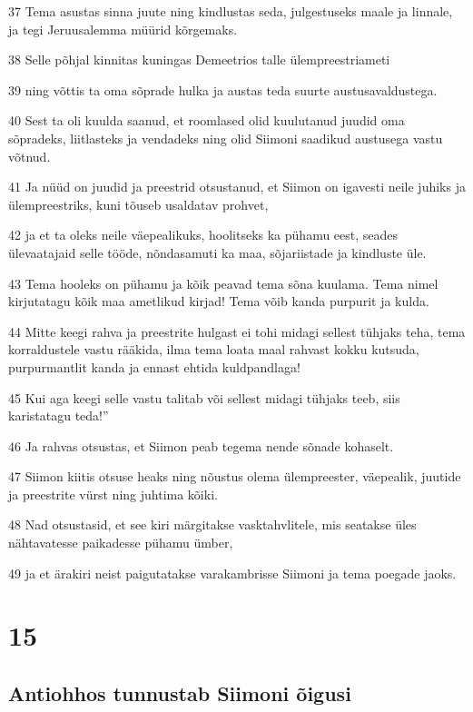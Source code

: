 \par 37 Tema asustas sinna juute ning kindlustas seda, julgestuseks maale ja linnale, ja tegi Jeruusalemma müürid kõrgemaks.
\par 38 Selle põhjal kinnitas kuningas Demeetrios talle ülempreestriameti
\par 39 ning võttis ta oma sõprade hulka ja austas teda suurte austusavaldustega.
\par 40 Sest ta oli kuulda saanud, et roomlased olid kuulutanud juudid oma sõpradeks, liitlasteks ja vendadeks ning olid Siimoni saadikud austusega vastu võtnud.
\par 41 Ja nüüd on juudid ja preestrid otsustanud, et Siimon on igavesti neile juhiks ja ülempreestriks, kuni tõuseb usaldatav prohvet,
\par 42 ja et ta oleks neile väepealikuks, hoolitseks ka pühamu eest, seades ülevaatajaid selle tööde, nõndasamuti ka maa, sõjariistade ja kindluste üle.
\par 43 Tema hooleks on pühamu ja kõik peavad tema sõna kuulama. Tema nimel kirjutatagu kõik maa ametlikud kirjad! Tema võib kanda purpurit ja kulda.
\par 44 Mitte keegi rahva ja preestrite hulgast ei tohi midagi sellest tühjaks teha, tema korraldustele vastu rääkida, ilma tema loata maal rahvast kokku kutsuda, purpurmantlit kanda ja ennast ehtida kuldpandlaga!
\par 45 Kui aga keegi selle vastu talitab või sellest midagi tühjaks teeb, siis karistatagu teda!”
\par 46 Ja rahvas otsustas, et Siimon peab tegema nende sõnade kohaselt.
\par 47 Siimon kiitis otsuse heaks ning nõustus olema ülempreester, väepealik, juutide ja preestrite vürst ning juhtima kõiki.
\par 48 Nad otsustasid, et see kiri märgitakse vasktahvlitele, mis seatakse üles nähtavatesse paikadesse pühamu ümber,
\par 49 ja et ärakiri neist paigutatakse varakambrisse Siimoni ja tema poegade jaoks.

\chapter{15}

\section*{Antiohhos tunnustab Siimoni õigusi}

